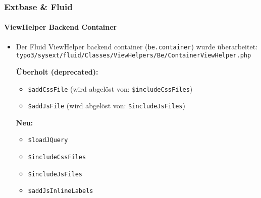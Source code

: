 
\begin{frame}[fragile]
	\frametitle{Extbase \& Fluid}
	\framesubtitle{ViewHelper Backend Container}

	\lstset{
		basicstyle=\smaller\ttfamily
	}

	\begin{itemize}
		\item Der Fluid ViewHelper backend container (\texttt{be.container}) wurde überarbeitet:\newline
			\smaller\texttt{typo3/sysext/fluid/Classes/ViewHelpers/Be/ContainerViewHelper.php}\normalsize\newline

			\smaller\textbf{Überholt (deprecated):}\normalsize
			\begin{itemize}
				\item \texttt{\$addCssFile} (wird abgelöst von: \texttt{\$includeCssFiles})
				\item \texttt{\$addJsFile} (wird abgelöst von: \texttt{\$includeJsFiles})
			\end{itemize}

			\smaller\textbf{Neu:}\normalsize
			\begin{itemize}
				\item \texttt{\$loadJQuery}
				\item \texttt{\$includeCssFiles}
				\item \texttt{\$includeJsFiles}
				\item \texttt{\$addJsInlineLabels}
			\end{itemize}

	\end{itemize}

\end{frame}



